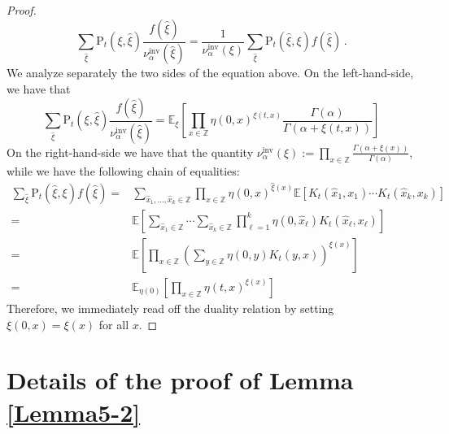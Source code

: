 \documentclass[a4paper,11pt,oneside,reqno]{amsart}
\theoremstyle{definition}
\numberwithin{equation}{section}
\begin{document}
{\begin{proof}
\begin{equation*}
		\sum_{\hat{\xi}}\mathrm{P}_{t}(\xi,\hat{\xi})\frac{f(\hat{\xi})}{\nu^{\text{inv}}_{\alpha}(\hat{\xi})}=\frac{1}{\nu^{\text{inv}}_{\alpha}(\xi)}\sum_{\hat{\xi}}\mathrm{P}_{t}(\hat{\xi},\xi)f(\hat{\xi})\,.
	\end{equation*}
	We analyze separately the two sides of the equation above. On the left-hand-side, we have that 
	\begin{equation*}
		\sum_{\hat{\xi}}\mathrm{P}_{t}(\xi,\hat{\xi})\frac{f(\hat{\xi})}{\nu^{\text{inv}}_{\alpha}(\hat{\xi})}=\mathbb{E}_{\xi}\left[\prod_{x\in \mathbb{Z}}\eta(0,x)^{\xi(t,x)}\frac{\Gamma(\alpha)}{\Gamma(\alpha+\xi(t,x))}\right]
	\end{equation*}
	On the right-hand-side we have that the quantity $\nu^{\text{inv}}_{\alpha}(\xi):=\prod_{x\in \mathbb{Z}}\frac{\Gamma(\alpha+\xi(x))}{\Gamma(\alpha)}$, while we have the following chain of equalities: 
	\begin{equation*}
		\begin{split}
			\sum_{\hat{\xi}}\mathrm{P}_{t}(\hat{\xi},\xi)f(\hat{\xi})=&\sum_{\hat{x}_{1},\ldots,\hat{x}_{k}\in \mathbb{Z}}\prod_{x\in \mathbb{Z}}\eta(0,x)^{\hat{\xi}(x)}\mathbb{E}\left[K_{t}(\hat{x}_{1},x_{1})\cdots K_{t}(\hat{x}_{k},x_{k})\right]
			\\=&
			\mathbb{E}\left[\sum_{\hat{x}_{1}\in \mathbb{Z}}\cdots \sum_{\hat{x}_{k}\in \mathbb{Z}}\prod_{\ell=1}^{k}\eta(0,\hat{x}_{\ell})K_{t}(\hat{x}_{\ell},x_{\ell})\right]
			\\=&
			\mathbb{E}\left[\prod_{x\in \mathbb{Z}}\left(\sum_{y\in \mathbb{Z}}\eta(0,y)K_{t}(y,x)\right)^{\xi(x)}\right]
			\\=&
			\mathbb{E}_{\eta(0)}\left[\prod_{x\in\mathbb{Z}}\eta(t,x)^{\xi(x)}\right]
		\end{split}
	\end{equation*}
	Therefore, we immediately read off the duality relation by setting $\xi(0,x)=\xi(x)$ for all $x$. 
\end{proof}
\section{Details of the proof of Lemma \ref{Lemma5-2}}\label{Appendix-details5-2}
}
\end{document}
